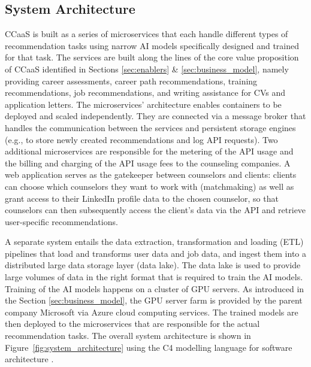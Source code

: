 \subsection{System Architecture}
\label{subsec:system_architecture}

CCaaS is built as a series of microservices that each handle different types of recommendation
tasks using narrow AI models specifically designed and trained for that task. The services are 
built along the lines of the core value proposition of CCaaS identified in Sections \ref{sec:enablers}
\& \ref{sec:business_model}, namely providing career assessments, career path recommendations, training
recommendations, job recommendations, and writing assistance for CVs and application letters. The
microservices' architecture enables containers to be deployed and scaled independently. They are
connected via a message broker that handles the communication between the services and persistent
storage engines (e.g., to store newly created recommendations and log API requests). Two additional
microservices are responsible for the metering of the API usage and the billing and charging of the
API usage fees to the counseling companies. A web application serves as the gatekeeper between
counselors and clients: clients can choose which counselors they want to work with (matchmaking)
as well as grant access to their LinkedIn profile data to the chosen counselor, so that counselors 
can then subsequently access the client's data via the API and retrieve user-specific recommendations.

A separate system entails the data extraction, transformation and loading (ETL) pipelines that load 
and transforms user data and job data, and ingest them into a distributed large data storage layer
(data lake). The data lake is used to provide large volumes of data in the right format that is 
required to train the AI models. Training of the AI models happens on a cluster of GPU servers. As
introduced in the Section \ref{sec:business_model}, the GPU server farm is provided by the parent
company Microsoft via Azure cloud computing services. The trained models are then deployed to the
microservices that are responsible for the actual recommendation tasks. The overall system architecture
is shown in Figure~\ref{fig:system_architecture} using the C4 modelling language for software architecture
\citep{brownC4ModelVisualising2010}.





